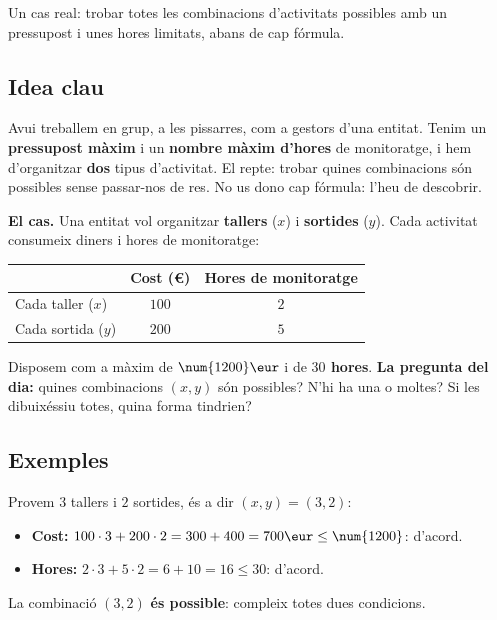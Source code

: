 %
{Un cas real: trobar totes les combinacions d'activitats possibles amb un pressupost i unes hores limitats, abans de cap fórmula.}

\subsection{Idea clau}

Avui treballem en grup, a les pissarres, com a gestors d'una entitat. Tenim un
\textbf{pressupost màxim} i un \textbf{nombre màxim d'hores} de monitoratge, i hem
d'organitzar \textbf{dos} tipus d'activitat. El repte: trobar quines combinacions són
possibles sense passar-nos de res. No us dono cap fórmula: l'heu de descobrir.

\begin{idea}
\textbf{El cas.} Una entitat vol organitzar \textbf{tallers} ($x$) i \textbf{sortides}
($y$). Cada activitat consumeix diners i hores de monitoratge:
\begin{center}
\begin{tabular}{lcc}
\toprule
 & Cost (\euro) & Hores de monitoratge \\
\midrule
Cada taller ($x$) & $100$ & $2$ \\
Cada sortida ($y$) & $200$ & $5$ \\
\bottomrule
\end{tabular}
\end{center}
Disposem com a màxim de \textbf{$\num{1200}\eur$} i de \textbf{$30$ hores}.
\textbf{La pregunta del dia:} quines combinacions $(x,y)$ són possibles? N'hi ha una
o moltes? Si les dibuixéssiu totes, quina forma tindrien?
\end{idea}

\subsection{Exemples}

\begin{exemple}
Provem $3$ tallers i $2$ sortides, és a dir $(x,y)=(3,2)$:
\begin{itemize}[leftmargin=1.4em, itemsep=2pt]
  \item \textbf{Cost:} $100\cdot 3+200\cdot 2=300+400=700\eur\le\num{1200}$: d'acord.
  \item \textbf{Hores:} $2\cdot 3+5\cdot 2=6+10=16\le 30$: d'acord.
\end{itemize}
La combinació $(3,2)$ \textbf{és possible}: compleix totes dues condicions.
\end{exemple}

